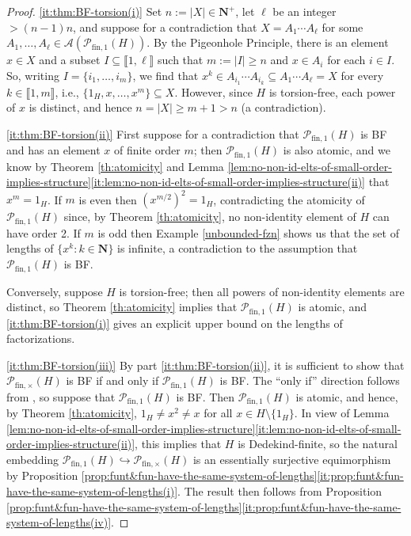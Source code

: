 \documentclass{report}
\renewcommand{\P}{\mathcal{P}}
\newcommand{\llb}{\llbracket}
\newcommand{\rrb}{\rrbracket}
\newcommand{\funt}{{\textrm{fin}, \times}}
\newcommand{\fun}{{\textrm{fin}, 1}}
\renewcommand{\:}{\text{:}}
\theoremstyle{definition}
\begin{document}
\begin{proof}
	\ref{it:thm:BF-torsion(i)}
	Set $n := |X| \in \mathbf N^+$, let $\ell$ be an integer $> (n-1)n$, and suppose for a contradiction that $X = A_1\cdots A_\ell$ for some $A_1,\dots, A_\ell\in \mathscr{A}(\P_\fun(H))$.
	By the Pigeonhole Principle, there is an element $x\in X$ and a subset $I \subseteq \llb 1,\ell \rrb$ such that $m := |I| \ge n$ and $x \in A_i$ for each $i\in I$.
	So, writing $I = \{i_1,\ldots, i_m\}$, we find that $x^k \in A_{i_1} \cdots A_{i_k} \subseteq A_1\cdots A_\ell = X$ for every $k \in \llb 1, m \rrb$, i.e., $\{1_H,x,\dots, x^m\} \subseteq X$.
	However, since $H$ is torsion-free, each power of $x$ is distinct, and hence $n = |X| \ge m+1 > n$ (a contradiction).
	
	\ref{it:thm:BF-torsion(ii)}
	First suppose for a contradiction that $\P_\fun(H)$ is BF and has an element $x$ of finite order $m$; then $\P_\fun(H)$ is also atomic, and we know by Theorem \ref{th:atomicity} and Lemma \ref{lem:no-non-id-elts-of-small-order-implies-structure}\ref{it:lem:no-non-id-elts-of-small-order-implies-structure(ii)} that $x^m = 1_H$.
	If $m$ is even then $(x^{m/2})^2 = 1_H$, contradicting the atomicity of $\P_\fun(H)$ since, by Theorem \ref{th:atomicity}, no non-identity element of $H$ can have order 2. 
	If $m$ is odd then Example \ref{unbounded-fzn} shows us that the set of lengths of $\{x^k : k \in \mathbf N \}$ is infinite, a contradiction to the assumption that $\P_\fun(H)$ is BF.
	
	Conversely, suppose $H$ is torsion-free; then all powers of non-identity elements are distinct, so Theorem \ref{th:atomicity} implies that $\P_\fun(H)$ is atomic, and \ref{it:thm:BF-torsion(i)} gives an explicit upper bound on the lengths of factorizations.
	
	\ref{it:thm:BF-torsion(iii)} 
	By part \ref{it:thm:BF-torsion(ii)}, it is sufficient to show that $\P_\funt(H)$ is BF if and only if $\P_\fun(H)$ is BF.
	The ``only if'' direction follows from \cite[Theorem 2.28(iv) and Corollary 2.29]{fan-tringali18}, so suppose that $\P_\fun(H)$ is BF.
	Then $\P_\fun(H)$ is atomic, and hence, by Theorem \ref{th:atomicity}, $1_H \neq x^2 \neq x$ for all $x\in H\setminus\{1_H\}$.
	In view of Lemma \ref{lem:no-non-id-elts-of-small-order-implies-structure}\ref{it:lem:no-non-id-elts-of-small-order-implies-structure(ii)}, this implies that $H$ is Dedekind-finite, so the natural embedding $\P_\fun(H)\hookrightarrow\P_\funt(H)$ is an essentially surjective equimorphism by Proposition \ref{prop:funt&fun-have-the-same-system-of-lengths}\ref{it:prop:funt&fun-have-the-same-system-of-lengths(i)}.
	The result then follows from Proposition  \ref{prop:funt&fun-have-the-same-system-of-lengths}\ref{it:prop:funt&fun-have-the-same-system-of-lengths(iv)}.
\end{proof}
\end{document}
